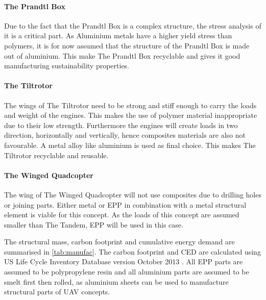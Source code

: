 \paragraph{The Prandtl Box} Due to the fact that the Prandtl Box is a complex structure, the stress analysis of it is a critical part. As Aluminium metals have a higher yield stress than polymers, it is for now assumed that the structure of the Prandtl Box is made out of aluminium. This make The Prandtl Box recyclable and gives it good manufacturing sustainability properties. 

\paragraph{The Tiltrotor} The wings of The Tiltrotor need to be strong and stiff enough to carry the loads and weight of the engines. This makes the use of polymer material inappropriate due to their low strength. Furthermore the engines will create loads in two direction, horizontally and vertically, hence composites materials are also not favourable. A metal alloy like aluminium is used as final choice. This makes The Tiltrotor recyclable and reusable.

\paragraph{The Winged Quadcopter} The wing of The Winged Quadcopter will not use composites due to drilling holes or joining parts. Either metal or EPP in combination with a metal structural element is viable for this concept. As the loads of this concept are assumed smaller than The Tandem, EPP will be used in this case.\newpage

The structural mass, carbon footprint and cumulative energy demand are summarised in \autoref{tab:manufac}. The carbon footprint and CED are calculated using US Life Cycle Inventory Database version October 2013 \cite{USLCI}. All EPP parts are assumed to be polypropylene resin and all aluminium parts are assumed to be smelt first then rolled, as aluminium sheets can be used to manufacture structural parts of UAV concepts.

